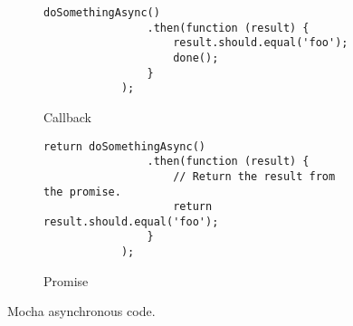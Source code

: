 \newcommand{\mochasize}{\scriptsize}
\begin{figure}[H]
	\centering
	\begin{subfigure}[b]{0.45\textwidth}
        \begin{lstlisting}[basicstyle=\mochasize]
			doSomethingAsync()
				.then(function (result) {
        			result.should.equal('foo');
        			done();
    			}
			);
		\end{lstlisting}
        \caption{Callback}
        \label{fig:mocha_callback}
    \end{subfigure}
    \begin{subfigure}[b]{0.5\textwidth}
		\begin{lstlisting}[basicstyle=\mochasize]
			return doSomethingAsync()
				.then(function (result) {
					// Return the result from the promise.
        			return result.should.equal('foo');
    			}
			);
		\end{lstlisting}
        \caption{Promise}
        \label{fig:mocha_promise}
    \end{subfigure}
	\caption[Mocha asynchronous code]{Mocha asynchronous code.}
	\label{fig:mocha_asynchronous_code}
\end{figure}

